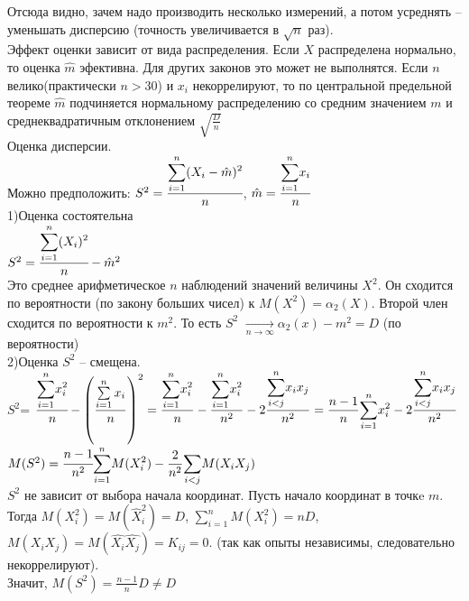 \documentclass[russian, 12pt, fleqn,x11names]{article}
\begin{document}
Отсюда видно, зачем надо производить несколько измерений, а потом усреднять -- уменьшать дисперсию (точность увеличивается  в $\sqrt{n}$ раз).\\
Эффект оценки зависит от вида распределения. Если $X$ распределена нормально, то оценка $\hat{m}$ эфективна.  Для других законов это может не выполнятся. Если $n$
велико(практически $n>30$) и $x_i$ некоррелируют, то по центральной предельной теореме $\hat{m}$ подчиняется нормальному распределению со средним значением $m$ и среднеквадратичным отклонением $\sqrt{\frac{D}{n}}$\\
Оценка дисперсии.\\
Можно предположить: $ S^2 = \cfrac{ \displaystyle{\sum \limits_{i = 1}^{n}} (X_i - \hat{m})^2 }{\normalsize  n}$, $\hat{m} = \cfrac{ \displaystyle{\sum \limits_{i = 1}^{n}} x_i}{n}$\\
1)Оценка состоятельна\\
$S^2=\cfrac{ \displaystyle{\sum \limits_{i = 1}^{n}} (X_i)^2 }{n}- \hat{m}^2$\\
Это среднее  арифметическое $n$ наблюдений значений величины $X^2$. Он сходится по вероятности (по закону больших чисел) к $M(X^2) = \alpha_2(X)$. Второй член сходится по вероятности к $m^2$. То есть $S^2$ $\displaystyle{\underset{n \rightarrow \infty}{\rightarrow}} \alpha_2(x) - m^2 = D$ (по вероятности)\\
2)Оценка $S^2$ -- смещена.\\
$S^2$= $\cfrac{ \displaystyle{\sum \limits_{i = 1}^{n}}x_i^2 }{n} -  \displaystyle{ \left ( \frac{\sum \limits_{i = 1}^{n}x_i }{n} \right )^2 } = \frac{ \displaystyle{\sum \limits_{i = 1}^{n}}x_i^2 }{n}  - \frac{ \displaystyle{\sum \limits_{i = 1}^{n}}x_i^2 }{n^2} - 2 \frac{ \displaystyle{\sum \limits_{i < j}^{n}}x_ix_j }{n^2}  = \frac{n - 1}{n} \displaystyle{\sum \limits_{i = 1}^{n}}x_i^2  - 2 \frac{ \displaystyle{\sum \limits_{i < j}^{n}}x_ix_j }{n^2}  $  \\
$M(S^2) = \cfrac{n - 1}{n^2}  \displaystyle{\sum \limits_{i = 1}^{n}}M(X_i^2) - \frac{2}{n^2}  \displaystyle{\sum \limits_{i < j}^{}} M(X_iX_j)$\\
$S^2$ не зависит от выбора начала координат. Пусть начало координат в точкe $m$. Тогда $M(X_i^2) = M(\hat{X}_i^2) =D$, $ \displaystyle{\sum \limits _{i=1} ^ {n}} M(X_i^2) = nD$, $M(X_iX_j) = M(\hat{X_i}\hat{X_j}) = K_{ij} = 0$. (так как опыты независимы, следовательно некоррелируют).\\
Значит, $M(S^2) = \frac{n - 1}{n} D \neq D$\\
\end{document}
